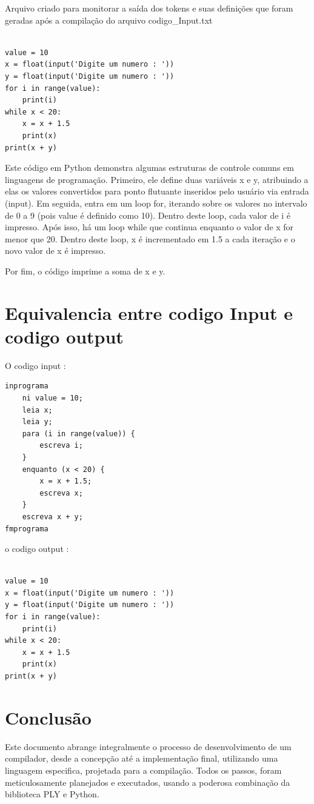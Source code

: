 \documentclass[a4paper,12pt]{article}
\begin{document}
Arquivo criado para monitorar a saída dos tokens e suas definições que 
foram geradas após a compilação do arquivo codigo\_Input.txt


\begin{Verbatim}

value = 10
x = float(input('Digite um numero : '))
y = float(input('Digite um numero : '))
for i in range(value):
    print(i)
while x < 20:
    x = x + 1.5
    print(x)
print(x + y)

\end{Verbatim}

Este código em Python demonstra algumas estruturas de controle comuns em 
linguagens de programação. Primeiro, ele define duas variáveis x e y, 
atribuindo a elas os valores convertidos para ponto flutuante inseridos 
pelo usuário via entrada (input). Em seguida, entra em um loop for, 
iterando sobre os valores no intervalo de 0 a 9 (pois value é definido 
como 10). Dentro deste loop, cada valor de i é impresso.
Após isso, há um loop while que continua enquanto o valor de x for menor 
que 20. Dentro deste loop, x é incrementado em 1.5 a cada iteração e o 
novo valor de x é impresso.

Por fim, o código imprime a soma de x e y.

\section{Equivalencia entre codigo Input e codigo output}
O codigo input : 
\begin{verbatim}
inprograma
    ni value = 10;
    leia x;
    leia y;
    para (i in range(value)) {
        escreva i;
    }
    enquanto (x < 20) {
        x = x + 1.5;
        escreva x;
    }
    escreva x + y;
fmprograma

\end{verbatim}
o codigo output : 
\begin{verbatim}
    
value = 10
x = float(input('Digite um numero : '))
y = float(input('Digite um numero : '))
for i in range(value):
    print(i)
while x < 20:
    x = x + 1.5
    print(x)
print(x + y)

\end{verbatim}

\newpage
\section{Conclusão}

Este documento abrange integralmente o processo de desenvolvimento de um compilador, desde a concepção até a implementação final, utilizando uma linguagem especifica, projetada para a compilação. Todos os passos, foram meticulosamente planejados e executados, usando a poderosa combinação da biblioteca PLY e Python.\\
\end{document}
